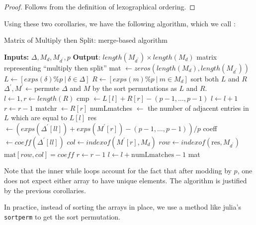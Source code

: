\begin{proof}
	Follows from the definition of lexographical
	ordering.
\end{proof}

Using these two corollaries, we have the following algorithm,
which we call \merge:

\begin{algorithm}[H]
\caption{Matrix of Multiply then Split: merge-based algorithm}
\label{alg:theta:merge}
\begin{algorithmic}[1]
\State \textbf{Inputs:} \(\Delta, M_{d}, M_{d^{\prime}}, p\)
\State \textbf{Output}: $length(M_{d^{\prime}}) \times length(M_{d})$ 
	matrix representing ``multiply then split''
\State mat \(\gets zeros(length(M_{d}), length(M_{d^{\prime}}))\) 
\State $L \gets [exps(\delta) \% p ~|~ \delta \in \Delta]$
\State $R \gets [exps(m) \% p ~|~ m \in M_{d}]$
\State sort both  \(L\) and \(R\) 
\State \(\Delta^{\prime}, M^{\prime} \gets \)permute \(\Delta\) and \(M\) by the sort permutations as \(L\) and \(R\).
\State \(l \gets 1, r \gets length(R)\)
	\State cmp \(\gets L[l] + R[r] - (p-1, \ldots, p-1)\) 
	    \State \(l \gets l + 1\) 
	    \State \(r \gets r - 1\)
        \State matchr \(\gets R[r]\) 
        \State numLmatches \(\gets\) the number of adjacent entries in \(L\) which are equal to \(L[l]\) 
                \State res \(\gets (exps(\Delta^{\prime}[ll]) + exps(M^{\prime}[r]) - (p-1, \ldots, p-1)) / p\) 
                \State coeff \(\gets coeff(\Delta^{\prime}[ll])\)
                \State \(col \gets indexof(M^{\prime}[r],M_{d})\)
                \State \(row \gets indexof(\text{res},M_{d^{\prime}})\)
                \State \(\text{mat}[row,col] = coeff\) 
            \EndFor
            \State \(r \gets r - 1\)
        \EndWhile     
        \State \(l \gets l + \text{numLmatches} - 1\) 
    \EndIf
\EndWhile
\State \Return mat
\end{algorithmic}
\end{algorithm}

Note that the inner while loops account for the fact that
after modding by \(p\), one does not expect 
either array to have unique elements.
The algorithm is justified by the previous corollaries.

In practice, instead of sorting the arrays in place, 
we use a method like julia's \texttt{sortperm}
to get the sort permutation.

